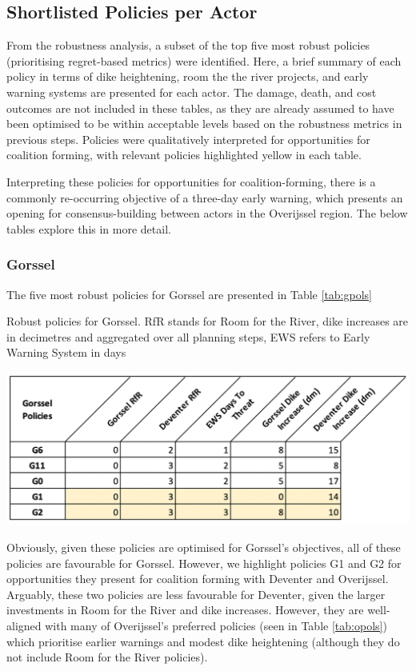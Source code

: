 \subsection{Shortlisted Policies per Actor}
From the robustness analysis, a subset of the top five most robust policies (prioritising regret-based metrics) were identified. Here, a brief summary of each policy in terms of dike heightening, room the the river projects, and early warning systems are presented for each actor. The damage, death, and cost outcomes are not included in these tables, as they are already assumed to have been optimised to be within acceptable levels based on the robustness metrics in previous steps. Policies were qualitatively interpreted for opportunities for coalition forming, with relevant policies highlighted yellow in each table.

Interpreting these policies for opportunities for coalition-forming, there is a commonly re-occurring objective of a three-day early warning, which presents an opening for consensus-building between actors in the Overijssel region. The below tables explore this in more detail.

\subsubsection{Gorssel}
The five most robust policies for Gorssel are presented in Table \ref{tab:gpols}

\begin{table}[h!]
  \centering
  \captionsetup{justification=centering,margin=2cm}
  \caption{Robust policies for Gorssel. RfR stands for Room for the River, dike increases are in decimetres and aggregated over all planning steps, EWS refers to Early Warning System in days}
  \label{tab:gpols}
  \includegraphics[width=0.8\linewidth]{report/figures/gpols.png}
\end{table}

Obviously, given these policies are optimised for Gorssel's objectives, all of these policies are favourable for Gorssel. However, we highlight policies G1 and G2 for opportunities they present for coalition forming with Deventer and Overijssel. Arguably, these two policies are less favourable for Deventer, given the larger investments in Room for the River and dike increases. However, they are well-aligned with many of Overijssel's preferred policies (seen in Table \ref{tab:opols}) which prioritise earlier warnings and modest dike heightening (although they do not include Room for the River policies).


